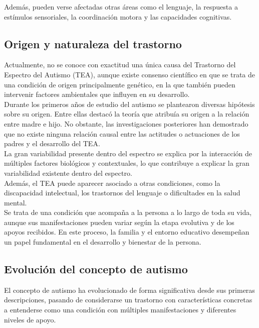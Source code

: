 \documentclass{article}
\begin{document}
Además, pueden verse afectadas otras áreas como el lenguaje, la respuesta a estímulos sensoriales, la coordinación motora y las capacidades cognitivas.

\subsection{\textbf{Origen y naturaleza del trastorno }}
Actualmente, no se conoce con exactitud una única causa del Trastorno del Espectro del Autismo (TEA), aunque existe consenso científico en que se trata de una condición de origen principalmente genético, en la que también pueden intervenir factores ambientales que influyen en su desarrollo.\\

Durante los primeros años de estudio del autismo se plantearon diversas hipótesis sobre su origen. Entre ellas destacó la teoría que atribuía su origen a la relación entre madre e hijo. No obstante, las investigaciones posteriores han demostrado que no existe ninguna relación causal entre las actitudes o actuaciones de los padres y el desarrollo del TEA.\\

La gran variabilidad presente dentro del espectro se explica por la interacción de múltiples factores biológicos y contextuales, lo que contribuye a explicar la gran variabilidad existente dentro del espectro.\\

Además, el TEA puede aparecer asociado a otras condiciones, como la discapacidad intelectual, los trastornos del lenguaje o dificultades en la salud mental.\\

Se trata de una condición que acompaña a la persona a lo largo de toda su vida, aunque sus manifestaciones pueden variar según la etapa evolutiva y de los apoyos recibidos. En este proceso, la familia y el entorno educativo desempeñan un papel fundamental en el desarrollo y bienestar de la persona. 

\subsection{\textbf{Evolución del concepto de autismo}}
El concepto de autismo ha evolucionado de forma significativa desde sus primeras descripciones, pasando de considerarse un trastorno con características concretas a entenderse como una condición con múltiples manifestaciones y diferentes niveles de apoyo.\\
\end{document}
